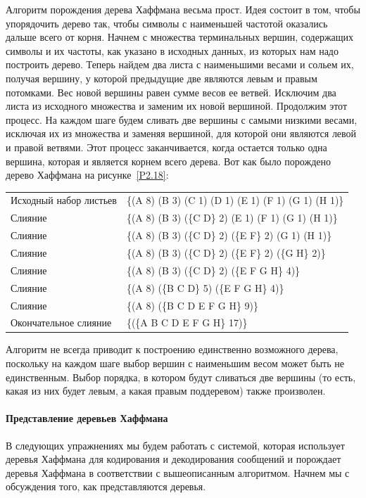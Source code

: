 Алгоритм порождения дерева Хаффмана весьма прост.  Идея
состоит в том, чтобы упорядочить дерево так, чтобы символы с наименьшей 
частотой оказались дальше всего от корня.  Начнем с множества терминальных 
вершин, содержащих символы и их частоты, как указано в исходных
данных, из которых нам надо построить дерево.  Теперь найдем два листа 
с наименьшими весами и сольем их, получая вершину, у которой
предыдущие две являются левым и правым потомками.  Вес новой вершины
равен сумме весов ее ветвей.  Исключим два листа из исходного
множества и заменим их новой вершиной.  Продолжим этот процесс.  На
каждом шаге будем сливать две вершины с самыми низкими весами,
исключая их из множества и заменяя вершиной, для которой они являются
левой и правой ветвями.  Этот процесс заканчивается, когда остается
только одна вершина, которая и является корнем всего дерева.  Вот как
было порождено дерево Хаффмана на рисунке~\ref{P2.18}:

\medskip
\hspace{-2em}
\begin{tabular}{ll}
Исходный набор  листьев & \{(A 8) (B 3) (C 1) (D 1) (E 1) (F 1) (G 1) (H 1)\} \\
Слияние & \{(A 8) (B 3) (\{C D\} 2) (E 1) (F 1) (G 1) (H 1)\} \\
Слияние & \{(A 8) (B 3) (\{C D\} 2) (\{E F\} 2) (G 1) (H 1)\} \\
Слияние & \{(A 8) (B 3) (\{C D\} 2) (\{E F\} 2) (\{G H\} 2)\} \\
Слияние & \{(A 8) (B 3) (\{C D\} 2) (\{E F G H\} 4)\} \\
Слияние & \{(A 8) (\{B C D\} 5) (\{E F G H\} 4)\} \\
Слияние & \{(A 8) (\{B C D E F G H\} 9)\} \\
Окончательное слияние & \{(\{A B C D E F G H\} 17)\} \\
\end{tabular}
\medskip

Алгоритм не всегда приводит к построению единственно возможного
дерева, поскольку на каждом шаге выбор вершин с наименьшим весом может 
быть не единственным.  Выбор порядка, в котором будут
сливаться две вершины (то есть, какая из них будет левым, а какая
правым поддеревом) также произволен.

\paragraph{Представление деревьев Хаффмана}


В следующих упражнениях мы будем работать с системой,
которая использует деревья Хаффмана для кодирования и декодирования
сообщений и порождает деревья Хаффмана в соответствии с вышеописанным
алгоритмом.  Начнем мы с обсуждения того, как представляются
деревья.

